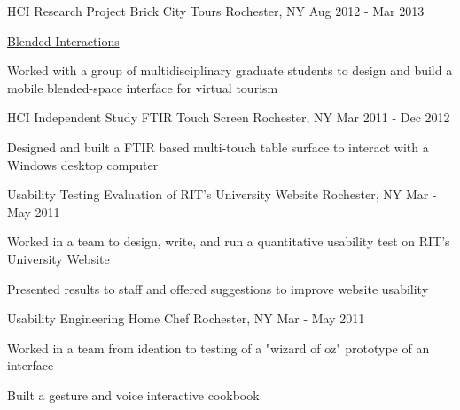 \begin{cventries}
  \cventry
    {HCI Research Project} %
    {Brick City Tours} %
    {Rochester, NY} %
    {Aug 2012 - Mar 2013} %
    {
      \begin{cvitems} %
        \item {\href{https://blendedinteractions.com/projects/brick-city-tours/}{Blended Interactions}}
        \item {Worked with a group of multidisciplinary graduate students to design and build a mobile blended-space interface for virtual tourism}
      \end{cvitems}
    }

  \cventry
    {HCI Independent Study} %
    {FTIR Touch Screen} %
    {Rochester, NY} %
    {Mar 2011 - Dec 2012} %
    {
      \begin{cvitems} %
        \item {Designed and built a FTIR based multi-touch table surface to interact with a Windows desktop computer}
      \end{cvitems}
    }

  \cventry
    {Usability Testing} %
    {Evaluation of RIT's University Website} %
    {Rochester, NY} %
    {Mar - May 2011} %
    {
      \begin{cvitems} %
        \item {Worked in a team to design, write, and run a quantitative usability test on RIT's University Website}
        \item {Presented results to staff and offered suggestions to improve website usability}
      \end{cvitems}
    }

  \cventry
    {Usability Engineering} %
    {Home Chef} %
    {Rochester, NY} %
    {Mar - May 2011} %
    {
      \begin{cvitems} %
        \item {Worked in a team from ideation to testing of a "wizard of oz" prototype of an interface}
        \item {Built a gesture and voice interactive cookbook}
      \end{cvitems}
    }


\end{cventries}
